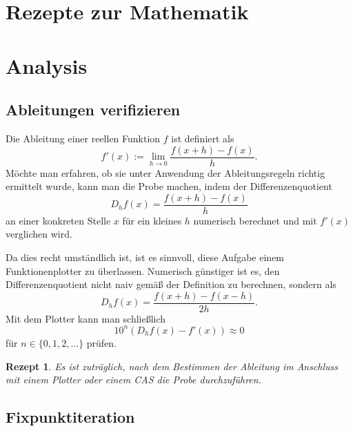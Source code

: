 \documentclass[a4paper,10pt,fleqn,twocolumn,twoside,dvipdfmx]{scrartcl}
\theoremstyle{rmbox}
\newtheorem{Rezept}{Rezept}[section]
\begin{document}
\section*{\LARGE Rezepte zur Mathematik}

\tableofcontents

\section{Analysis}

\subsection{Ableitungen verifizieren}

Die Ableitung einer reellen Funktion $f$ ist definiert als%
\[f'(x) := \lim_{h\to 0}\frac{f(x+h)-f(x)}{h}.\]
Möchte man erfahren, ob sie unter Anwendung
der Ableitungsregeln richtig ermittelt wurde, kann man die Probe
machen, indem der Differenzenquotient%
\[D_h f(x) = \frac{f(x+h)-f(x)}{h}\]
an einer konkreten Stelle $x$ für ein kleines $h$ numerisch
berechnet und mit $f'(x)$ verglichen wird.

Da dies recht umständlich ist, ist es sinnvoll, diese Aufgabe einem
Funktionenplotter zu überlassen. Numerisch günstiger ist es, den
Differenzenquotient nicht naiv gemäß der Definition zu berechnen,
sondern als%
\[D_h f(x) = \frac{f(x+h)-f(x-h)}{2h}.\]
Mit dem Plotter kann man schließlich
\[10^n (D_h f(x) - f'(x)) \approx 0\]
für $n\in\{0,1,2,\ldots\}$ prüfen.

\begin{Rezept}
Es ist zuträglich, nach dem Bestimmen der Ableitung im Anschluss
mit einem Plotter oder einem CAS die Probe durchzuführen.
\end{Rezept}

\subsection{Fixpunktiteration}
\end{document}
